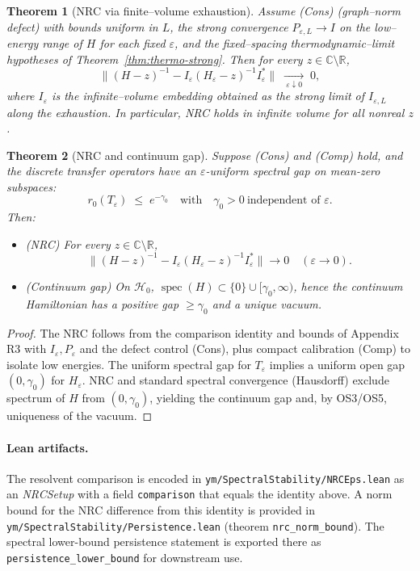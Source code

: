 \documentclass[11pt]{amsart}
\theoremstyle{plain}
\newtheorem{theorem}{Theorem}[section]
\theoremstyle{definition}
\theoremstyle{remark}
\begin{document}
\begin{theorem}[NRC via finite–volume exhaustion]
Assume (Cons) (graph–norm defect) with bounds uniform in $L$, the strong convergence $P_{\varepsilon,L}\to I$ on the low–energy range of $H$ for each fixed $\varepsilon$, and the fixed–spacing thermodynamic–limit hypotheses of Theorem~\ref{thm:thermo-strong}. Then for every $z\in\mathbb C\setminus\mathbb R$,
\[
  \big\|(H-z)^{-1}-I_{\varepsilon}(H_{\varepsilon}-z)^{-1}I_{\varepsilon}^*\big\|\;\xrightarrow[\ \varepsilon\downarrow 0\ ]{}\;0,
\]
where $I_{\varepsilon}$ is the infinite–volume embedding obtained as the strong limit of $I_{\varepsilon,L}$ along the exhaustion. In particular, NRC holds in infinite volume for all nonreal $z$.
\end{theorem}

\begin{theorem}[NRC and continuum gap]
Suppose (Cons) and (Comp) hold, and the discrete transfer operators have an $\varepsilon$-uniform spectral gap on mean-zero subspaces:
\[
  r_0(T_{\varepsilon})\;\le\;e^{-\gamma_0}\quad\text{with}\quad \gamma_0>0\ \text{independent of }\varepsilon.
\]
Then:
\begin{itemize}
  \item (NRC) For every $z\in\mathbb C\setminus\mathbb R$,
  \[
    \bigl\|(H-z)^{-1}-I_{\varepsilon}(H_{\varepsilon}-z)^{-1}I_{\varepsilon}^*\bigr\|\to 0\quad(\varepsilon\to 0).
  \]
  \item (Continuum gap) On $\mathcal H_0$, $\operatorname{spec}(H)\subset\{0\}\cup[\gamma_0,\infty)$, hence the continuum Hamiltonian has a positive gap $\ge \gamma_0$ and a unique vacuum.
\end{itemize}
\end{theorem}

\begin{proof}
The NRC follows from the comparison identity and bounds of Appendix R3 with $I_{\varepsilon},P_{\varepsilon}$ and the defect control (Cons), plus compact calibration (Comp) to isolate low energies. The uniform spectral gap for $T_{\varepsilon}$ implies a uniform open gap $(0,\gamma_0)$ for $H_{\varepsilon}$. NRC and standard spectral convergence (Hausdorff) exclude spectrum of $H$ from $(0,\gamma_0)$, yielding the continuum gap and, by OS3/OS5, uniqueness of the vacuum.
\end{proof}

\paragraph{Lean artifacts.}
The resolvent comparison is encoded in \texttt{ym/SpectralStability/NRCEps.lean} as an \emph{NRCSetup} with a field \texttt{comparison} that equals the identity above. A norm bound for the NRC difference from this identity is provided in \texttt{ym/SpectralStability/Persistence.lean} (theorem \texttt{nrc\_norm\_bound}). The spectral lower-bound persistence statement is exported there as \texttt{persistence\_lower\_bound} for downstream use.
\end{document}
